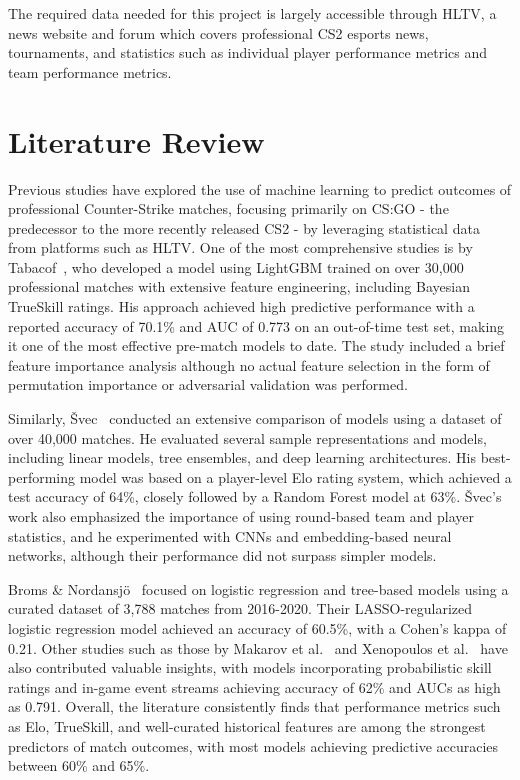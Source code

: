 \documentclass[11pt]{article}
\begin{document}
The required data needed for this project is largely accessible through HLTV, a news website and forum which covers professional CS2 esports news, tournaments, and statistics such as individual player performance metrics and team performance metrics.
\section{Literature Review}
Previous studies have explored the use of machine learning to predict outcomes of professional Counter-Strike matches, focusing primarily on CS:GO - the predecessor to the more recently released CS2 - by leveraging statistical data from platforms such as HLTV. One of the most comprehensive studies is by Tabacof~\cite{tabacof2023csgo}, who developed a model using LightGBM trained on over 30,000 professional matches with extensive feature engineering, including Bayesian TrueSkill ratings. His approach achieved high predictive performance with a reported accuracy of 70.1\% and AUC of 0.773 on an out-of-time test set, making it one of the most effective pre-match models to date. The study included a brief feature importance analysis although no actual feature selection in the form of permutation importance or adversarial validation was performed.

Similarly, Švec~\cite{svec2022csgo} conducted an extensive comparison of models using a dataset of over 40,000 matches. He evaluated several sample representations and models, including linear models, tree ensembles, and deep learning architectures. His best-performing model was based on a player-level Elo rating system, which achieved a test accuracy of 64\%, closely followed by a Random Forest model at 63\%. Švec's work also emphasized the importance of using round-based team and player statistics, and he experimented with CNNs and embedding-based neural networks, although their performance did not surpass simpler models.

Broms \& Nordansjö~\cite{broms2024cs} focused on logistic regression and tree-based models using a curated dataset of 3,788 matches from 2016-2020. Their LASSO-regularized logistic regression model achieved an accuracy of 60.5\%, with a Cohen's kappa of 0.21.
Other studies such as those by Makarov et al.~\cite{makarov2018predicting} and Xenopoulos et al.~\cite{xenopoulos2020valuing} have also contributed valuable insights, with models incorporating probabilistic skill ratings and in-game event streams achieving accuracy of 62\% and AUCs as high as 0.791. Overall, the literature consistently finds that performance metrics such as Elo, TrueSkill, and well-curated historical features are among the strongest predictors of match outcomes, with most models achieving predictive accuracies between 60\% and 65\%.
\end{document}
